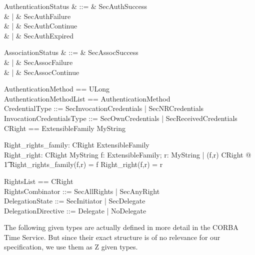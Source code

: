 \begin{syntax}
   AuthenticationStatus & ::= & SecAuthSuccess\\
  & | & SecAuthFailure\\
  & | & SecAuthContinue\\
  & | & SecAuthExpired\\
\end{syntax}
\begin{syntax}
   AssociationStatus & ::= & SecAssocSuccess\\
  & | & SecAssocFailure\\
  & | & SecAssocContinue\\
\end{syntax}
 
  
\begin{zed}
  AuthenticationMethod == ULong \\
  AuthenticationMethodList == \seq AuthenticationMethod \\
  CredentialType ::= SecInvocationCredentials | SecNRCredentials \\
  InvocationCredentialsType ::= SecOwnCredentials | SecReceivedCredentials \\
  CRight == ExtensibleFamily \cross MyString
\end{zed}
\begin{axdef}
  Right\_rights\_family: CRight \fun ExtensibleFamily \\
  Right\_right: CRight \fun MyString
  \where
  \forall f: ExtensibleFamily; r: MyString | (f,r) \in CRight @ \\
  \t1 Right\_rights\_family(f,r) = f \land Right\_right(f,r) = r
\end{axdef}
  
\begin{zed}
  RightsList == \seq CRight \\
  RightsCombinator ::= SecAllRights | SecAnyRight \\
  DelegationState ::= SecInitiator | SecDelegate \\
  DelegationDirective ::= Delegate | NoDelegate \\
\end{zed}
The following given types are actually defined in more detail in the CORBA Time
Service.  But since their exact structure is of no relevance for our
specification, we use them as Z given types.

